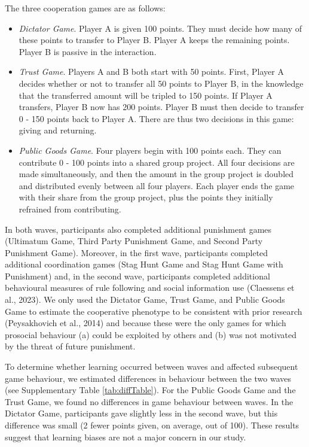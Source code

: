 \documentclass[
  man,floatsintext]{apa6}
\providecommand{\tightlist}{%
  \setlength{\itemsep}{0pt}\setlength{\parskip}{0pt}}
\begin{document}
The three cooperation games are as follows:

\begin{itemize}
\tightlist
\item
  \emph{Dictator Game}. Player A is given 100 points. They must decide how many of
  these points to transfer to Player B. Player A keeps the remaining points.
  Player B is passive in the interaction.
\item
  \emph{Trust Game}. Players A and B both start with 50 points. First, Player A
  decides whether or not to transfer all 50 points to Player B, in the
  knowledge that the transferred amount will be tripled to 150 points. If
  Player A transfers, Player B now has 200 points. Player B must then decide to
  transfer 0 - 150 points back to Player A. There are thus two decisions in
  this game: giving and returning.
\item
  \emph{Public Goods Game}. Four players begin with 100 points each. They can
  contribute 0 - 100 points into a shared group project. All four decisions are
  made simultaneously, and then the amount in the group project is doubled and
  distributed evenly between all four players. Each player ends the game with
  their share from the group project, plus the points they initially refrained
  from contributing.
\end{itemize}

In both waves, participants also completed additional punishment games
(Ultimatum Game, Third Party Punishment Game, and Second Party Punishment Game).
Moreover, in the first wave, participants completed additional coordination
games (Stag Hunt Game and Stag Hunt Game with Punishment) and, in the second
wave, participants completed additional behavioural measures of rule following
and social information use (Claessens et al., 2023). We only used the Dictator Game,
Trust Game, and Public Goods Game to estimate the cooperative phenotype to be
consistent with prior research (Peysakhovich et al., 2014) and because these were the
only games for which prosocial behaviour (a) could be exploited by others and
(b) was not motivated by the threat of future punishment.

To determine whether learning occurred between waves and affected subsequent
game behaviour, we estimated differences in behaviour between the two waves (see
Supplementary Table \ref{tab:diffTable}). For the Public Goods Game and the
Trust Game, we found no differences in game behaviour between waves. In the
Dictator Game, participants gave slightly less in the second wave, but this
difference was small (2 fewer points given, on average, out of 100). These
results suggest that learning biases are not a major concern in our study.
\end{document}
